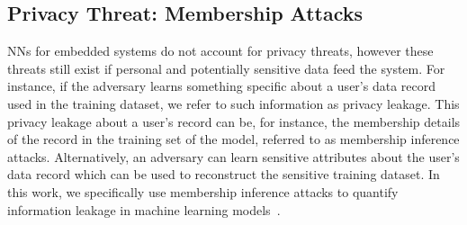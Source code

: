 \subsection{Privacy Threat: Membership Attacks}
\label{threatmodel}

NNs for embedded systems do not account for privacy threats, however these threats still exist if personal and potentially sensitive data feed the system.
For instance, if the adversary learns something specific about a user's data record used in the training dataset, we refer to such information as privacy leakage.
This privacy leakage about a user's record can be, for instance, the membership details of the record in the training set of the model, referred to as membership inference attacks.
Alternatively, an adversary can learn sensitive attributes about the user's data record which can be used to reconstruct the sensitive training dataset.
In this work, we specifically use membership inference attacks to quantify information leakage in machine learning models~\cite{shokri2017membership}.


